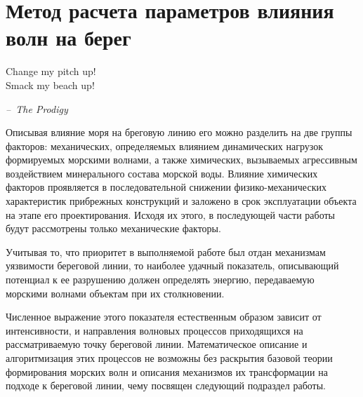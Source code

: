 
\newpage
\section{Метод расчета параметров влияния волн на берег}
\label{part:sea_stuff}

\epigraph{
    Change my pitch up!\\
    Smack my  beach up!
}{\textit{--~The Prodigy}}

Описывая влияние моря на бреговую линию его можно разделить на две группы факторов: механических, определяемых влиянием динамических нагрузок формируемых морскими волнами, а также химических, вызываемых агрессивным воздействием минерального состава морской воды.
Влияние химических факторов проявляется в последовательной снижении физико-механических характеристик прибрежных конструкций и заложено в срок эксплуатации объекта на этапе его проектирования.
Исходя их этого, в последующей части работы будут рассмотрены только механические факторы.

Учитывая то, что приоритет в выполняемой работе был отдан механизмам уязвимости береговой линии, то наиболее удачный показатель, описывающий потенциал к ее разрушению должен определять энергию, передаваемую морскими волнами объектам при их столкновении.

Численное выражение этого показателя естественным образом зависит от интенсивности, и направления волновых процессов приходящихся на рассматриваемую точку береговой линии.
Математическое описание и алгоритмизация этих процессов не возможны без раскрытия базовой теории формирования морских волн и описания механизмов их трансформации на подходе к береговой линии, чему посвящен следующий подраздел работы.   
